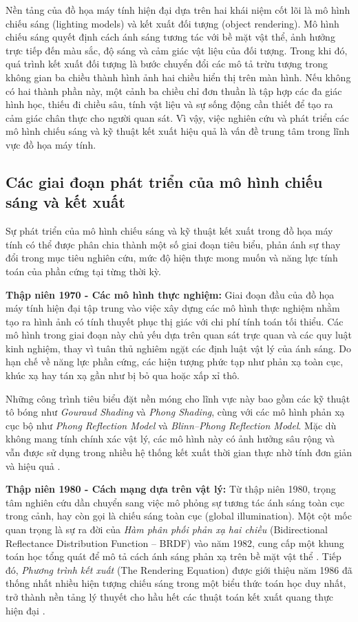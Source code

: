 Nền tảng của đồ họa máy tính hiện đại dựa trên hai khái niệm cốt lõi là mô hình chiếu sáng (lighting models) và kết xuất đối tượng (object rendering). Mô hình chiếu sáng quyết định cách ánh sáng tương tác với bề mặt vật thể, ảnh hưởng trực tiếp đến màu sắc, độ sáng và cảm giác vật liệu của đối tượng. Trong khi đó, quá trình kết xuất đối tượng là bước chuyển đổi các mô tả trừu tượng trong không gian ba chiều thành hình ảnh hai chiều hiển thị trên màn hình. Nếu không có hai thành phần này, một cảnh ba chiều chỉ đơn thuần là tập hợp các đa giác hình học, thiếu đi chiều sâu, tính vật liệu và sự sống động cần thiết để tạo ra cảm giác chân thực cho người quan sát. Vì vậy, việc nghiên cứu và phát triển các mô hình chiếu sáng và kỹ thuật kết xuất hiệu quả là vấn đề trung tâm trong lĩnh vực đồ họa máy tính.

\subsection{Các giai đoạn phát triển của mô hình chiếu sáng và kết xuất}

Sự phát triển của mô hình chiếu sáng và kỹ thuật kết xuất trong đồ họa máy tính có thể được phân chia thành một số giai đoạn tiêu biểu, phản ánh sự thay đổi trong mục tiêu nghiên cứu, mức độ hiện thực mong muốn và năng lực tính toán của phần cứng tại từng thời kỳ.

\textbf{Thập niên 1970 - Các mô hình thực nghiệm:}
Giai đoạn đầu của đồ họa máy tính hiện đại tập trung vào việc xây dựng các mô hình thực nghiệm nhằm tạo ra hình ảnh có tính thuyết phục thị giác với chi phí tính toán tối thiểu. Các mô hình trong giai đoạn này chủ yếu dựa trên quan sát trực quan và các quy luật kinh nghiệm, thay vì tuân thủ nghiêm ngặt các định luật vật lý của ánh sáng. Do hạn chế về năng lực phần cứng, các hiện tượng phức tạp như phản xạ toàn cục, khúc xạ hay tán xạ gần như bị bỏ qua hoặc xấp xỉ thô.

Những công trình tiêu biểu đặt nền móng cho lĩnh vực này bao gồm các kỹ thuật tô bóng như \textit{Gouraud Shading} và \textit{Phong Shading}, cùng với các mô hình phản xạ cục bộ như \textit{Phong Reflection Model} và \textit{Blinn--Phong Reflection Model}. Mặc dù không mang tính chính xác vật lý, các mô hình này có ảnh hưởng sâu rộng và vẫn được sử dụng trong nhiều hệ thống kết xuất thời gian thực nhờ tính đơn giản và hiệu quả \cite{overview_of_BRDF_models_2023, survey_of_brdf_models_2009}.

\textbf{Thập niên 1980 - Cách mạng dựa trên vật lý:}
Từ thập niên 1980, trọng tâm nghiên cứu dần chuyển sang việc mô phỏng sự tương tác ánh sáng toàn cục trong cảnh, hay còn gọi là chiếu sáng toàn cục (global illumination). Một cột mốc quan trọng là sự ra đời của \textit{Hàm phân phối phản xạ hai chiều} (Bidirectional Reflectance Distribution Function -- BRDF) vào năm 1982, cung cấp một khung toán học tổng quát để mô tả cách ánh sáng phản xạ trên bề mặt vật thể \cite{a_reflectance_model_1982}. Tiếp đó, \textit{Phương trình kết xuất} (The Rendering Equation) được giới thiệu năm 1986 đã thống nhất nhiều hiện tượng chiếu sáng trong một biểu thức toán học duy nhất, trở thành nền tảng lý thuyết cho hầu hết các thuật toán kết xuất quang thực hiện đại \cite{render_equa2}.


